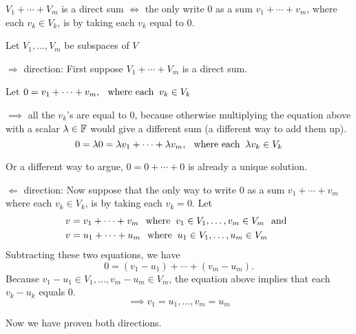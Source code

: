 \setcounter{thm}{44}
\begin{thm} 
  \label{condition-for-a-direct-sum}
  $V_1 + \cdots + V_m$ is a direct sum $\iff$ the only write $0$ as a sum $v_1 + \cdots + v_m$, where each $v_k \in V_k$, is by taking each $v_k$ equal to $0$.
\end{thm}
\begin{prf} Let  $V_1, \ldots, V_m$ be subspaces of $V$ 
  \begin{description}
    \item{$\Rightarrow$ direction:} First suppose $V_1 + \cdots + V_m$ is a direct sum. 

    Let $0 = v_1 + \cdots + v_m, \;\;\, \text{where each}\;\; v_k \in V_k $
    
    $\implies$ all the $v_k$'s are equal to $0$, because otherwise multiplying the equation above with a scalar $\lambda \in \mathbb{F}$ would give a different sum (a different way to add them up).
    \begin{equation}
      0 = \lambda0= \lambda v_1 + \cdots + \lambda v_m, \;\;\, \text{where each}\;\; \lambda v_k \in V_k
    \end{equation}
    
    Or a different way to argue, $0 = 0 + \cdots + 0$ is already a unique solution. 
    
    \item{$\Leftarrow$ direction:} Now suppose that the only way to write $0$ as a sum $v_1 + \cdots + v_m$ where each $v_k \in V_k$, is by taking each $v_k = 0$. Let
    \begin{equation}
      \begin{aligned}
        v&=v_1 + \cdots + v_m \;\;\, \text{where}\;\; v_1 \in V_1, \ldots, v_m \in V_m \;\;\, \text{and}\;\; \\
        v&=u_1 + \cdots + u_m  \;\;\, \text{where}\;\; u_1 \in V_1, \ldots, u_m \in V_m
      \end{aligned}
    \end{equation}
    Subtracting these two equations, we have
    \begin{equation}
      0=(v_1-u_1)+\cdots+(v_m-u_m).
    \end{equation}
    Because $v_1 - u_1 \in V_1, \ldots, v_m - u_m \in V_m$, the equation above implies that each $v_k -u_k$ equals $0$.
    \begin{equation}
      \implies v_1=u_1, \ldots, v_m=u_m
    \end{equation}
  \end{description}
  Now we have proven both directions.
\end{prf}

